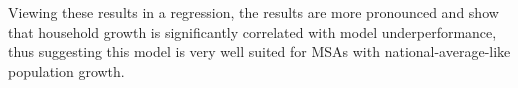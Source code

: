%    
%

Viewing these results in a regression, the results are more pronounced and show that household growth is significantly correlated with model underperformance, thus suggesting this model is very well suited for MSAs with national-average-like population growth. 

